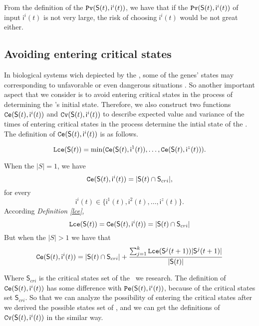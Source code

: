 From the definition of the ${\tt Pv}(\mathsf{S}(t), \mathsf{ i}^{i}(t))$, we have that if the ${\tt Pv}(\mathsf{S}(t), \mathsf{ i}^{i}(t))$ of input $\mathsf{ i}^{i}(t)$ is not very large, the risk of choosing $\mathsf{ i}^{i}(t)$ would be not great either.
\subsection{Avoiding entering critical states}
In biological systems wich depiected by the \BCNs, some of the genes' states may corresponding to unfavorable or even dangerous situations \cite{Li2014Controllability}. So another important aspect that we consider is to avoid entering critical states in the process of determining the \BCN's initial state. Therefore, we also construct two functions ${\tt Ce}(\mathsf{S}(t), \mathsf{ i}^{i}(t))$ and ${\tt Cv}(\mathsf{S}(t), \mathsf{ i}^{i}(t))$ to describe expected value and variance of the times of entering critical states in the process determine the intial state of the \BCNs. The definition of ${\tt Ce}(\mathsf{S}(t), \mathsf{ i}^{i}(t))$ is as follows.\\
\begin{definition}[$\Lce(S)$] \label{lce}
\[{\tt Lce}(\mathsf{S}(t))= \min({\tt Ce}(\mathsf{S}(t), \mathsf{ i}^{1}(t)),\ldots,{\tt Ce}(\mathsf{S}(t), \mathsf{ i}^{z}(t))).\]
\end{definition}
\begin{definition} 
When the $|S|=1$, we have \[{\tt Ce}(\mathsf{S}(t), \mathsf{ i}^{i}(t))=|\mathsf{S}(t) \cap \mathsf{S}_{cri} |,\]  for every \[\mathsf{ i}^{i}(t) \in \{\mathsf{ i}^{1}(t),\mathsf{ i}^{2}(t),\ldots, \mathsf{ i}^{z}(t)\}.\]  
According {\em Definition \ref{lce}}, %
\[{\tt Lce}(\mathsf{S}(t))={\tt Ce}(\mathsf{S}(t), \mathsf{ i}^{i}(t))=|\mathsf{S}(t) \cap \mathsf{S}_{cri} |\] 
But when the $|S|>1$ 
we have that 
\[{\tt Ce}(\mathsf{S}(t), \mathsf{ i}^{i}(t))=|\mathsf{S}(t) \cap \mathsf{S}_{cri}| +\frac{\sum_{j=1}^k {\tt Lce}(\mathsf{S}^{j}(t+1))|\mathsf{S}^{j}(t+1)|}{ |\mathsf{S}(t)|} \] 
\end{definition}

Where $\mathsf{S}_{cri}$ is the critical states set of the \BCN\ we research. The definition of ${\tt Ce}(\mathsf{S}(t), \mathsf{ i}^{i}(t))$ has some difference with ${\tt Pe}(\mathsf{S}(t), \mathsf{ i}^{i}(t))$, because of the critical states set $\mathsf{S}_{cri}$. So that we can analyze the possibility of entering the critical states after we derived the possible states set of \BCNs, and we can get the definitions of ${\tt Cv}(\mathsf{S}(t), \mathsf{ i}^{i}(t))$ in the similar way. %

